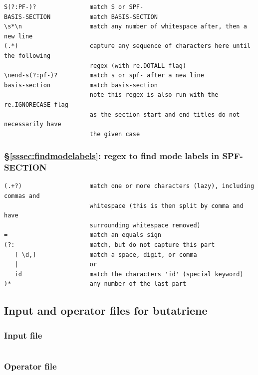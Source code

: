 \documentclass[12pt]{article}
\newenvironment{code}{\captionsetup{type=listing}}{\par\addvspace{\baselineskip}}
\begin{document}
\begin{code}\begin{verbatim}
S(?:PF-)?               match S or SPF-
BASIS-SECTION           match BASIS-SECTION
\s*\n                   match any number of whitespace after, then a new line
(.*)                    capture any sequence of characters here until the following
                        regex (with re.DOTALL flag)
\nend-s(?:pf-)?         match s or spf- after a new line
basis-section           match basis-section
                        note this regex is also run with the re.IGNORECASE flag
                        as the section start and end titles do not necessarily have
                        the given case
\end{verbatim}
\end{code}

\subsubsection*{\S\ref{sssec:findmodelabels}: regex to find mode labels in SPF-SECTION}

\begin{code}\begin{verbatim}
(.+?)                   match one or more characters (lazy), including commas and
                        whitespace (this is then split by comma and have 
                        surrounding whitespace removed)
=                       match an equals sign
(?:                     match, but do not capture this part
   [ \d,]               match a space, digit, or comma
   |                    or
   id                   match the characters 'id' (special keyword)
)*                      any number of the last part
\end{verbatim}
\end{code}

\subsection{Input and operator files for butatriene}\label{ssec:inputop}

\subsubsection*{Input file}

\inputminted{text}{inputop/butatriene.inp}

\subsubsection*{Operator file}

\inputminted{text}{inputop/C4H4linear.op}
\end{document}
